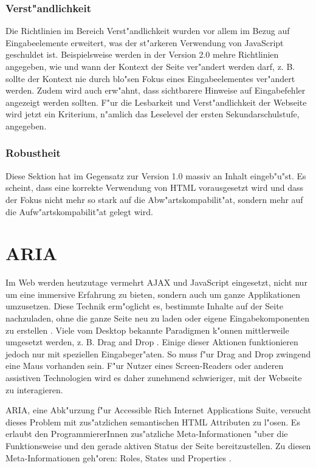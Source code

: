 \documentclass[a4paper,bibtotoc,oneside]{scrbook}
\begin{document}
\subsection{Verst"andlichkeit}
Die Richtlinien im Bereich Verst"andlichkeit wurden vor allem im Bezug auf Eingabeelemente erweitert, was der st"arkeren Verwendung von JavaScript geschuldet ist. Beispielsweise werden in der Version 2.0 mehre Richtlinien angegeben, wie und wann der Kontext der Seite ver"andert werden darf, z. B. sollte der Kontext nie durch blo"sen Fokus eines Eingabeelementes ver"andert werden. Zudem wird auch erw"ahnt, dass sichtbarere Hinweise auf Eingabefehler angezeigt werden sollten. F"ur die Lesbarkeit und Verst"andlichkeit der Webseite wird jetzt ein Kriterium, n"amlich das Leselevel der ersten Sekundarschulstufe, angegeben.

\subsection{Robustheit}
Diese Sektion hat im Gegensatz zur Version 1.0 massiv an Inhalt eingeb"u"st. Es scheint, dass eine korrekte Verwendung von HTML vorausgesetzt wird und dass der Fokus nicht mehr so stark auf die Abw"artskompabilit"at, sondern mehr auf die Aufw"artskompabilit"at gelegt wird.

\chapter{ARIA}
Im Web werden heutzutage vermehrt AJAX und JavaScript eingesetzt, nicht nur um eine immersive Erfahrung zu bieten, sondern auch um ganze Applikationen umzusetzen. Diese Technik erm"oglicht es, bestimmte Inhalte auf der Seite nachzuladen, ohne die ganze Seite neu zu laden oder eigene Eingabekomponenten zu erstellen \cite[S.26]{mod_software}. Viele vom Desktop bekannte Paradigmen k"onnen mittlerweile umgesetzt werden, z. B. \glqq Drag and Drop \grqq. Einige dieser Aktionen funktionieren jedoch nur mit speziellen Eingabeger"aten. So muss f"ur Drag and Drop zwingend eine Maus vorhanden sein. F"ur Nutzer eines Screen-Readers oder anderen assistiven Technologien wird es daher zunehmend schwieriger, mit der Webseite zu interagieren. \cite{aria_intro}

ARIA, eine Abk"urzung f"ur Accessible Rich Internet Applications Suite, versucht dieses Problem mit zus"atzlichen semantischen HTML Attributen zu l"osen. Es erlaubt den ProgrammiererInnen zus"atzliche Meta-Informationen "uber die Funktionsweise und den gerade aktiven Status der Seite bereitzustellen. Zu diesen Meta-Informationen geh"oren: Roles, States und Properties \cite{aria_intro}. 
\end{document}
